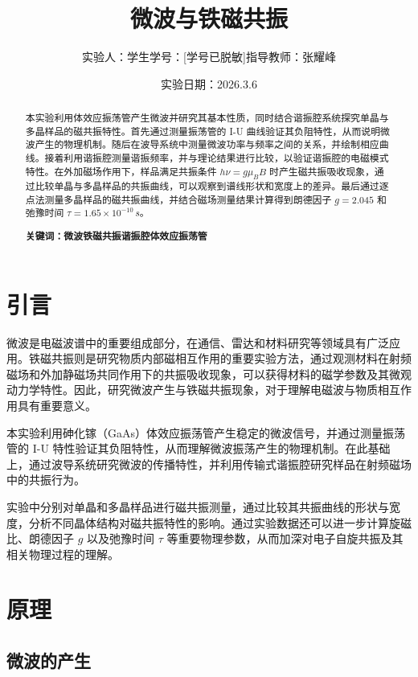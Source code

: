 \documentclass[a4paper, 1.5lines]{ctexart}
\title{微波与铁磁共振}
\author{实验人：学生\qquad 学号：[学号已脱敏]\qquad 指导教师：张耀峰}
\date{实验日期：2026.3.6}
\begin{document}
    
    \maketitle
    
    \begin{abstract}
         
        本实验利用体效应振荡管产生微波并研究其基本性质，同时结合谐振腔系统探究单晶与多晶样品的磁共振特性。首先通过测量振荡管的 I-U 曲线验证其负阻特性，从而说明微波产生的物理机制。随后在波导系统中测量微波功率与频率之间的关系，并绘制相应曲线。接着利用谐振腔测量谐振频率，并与理论结果进行比较，以验证谐振腔的电磁模式特性。在外加磁场作用下，样品满足共振条件 $h\nu = g\mu_B B$ 时产生磁共振吸收现象，通过比较单晶与多晶样品的共振曲线，可以观察到谱线形状和宽度上的差异。最后通过逐点法测量多晶样品的磁共振曲线，并结合磁场测量结果计算得到朗德因子 $g = 2.045$ 和弛豫时间 $\tau = 1.65 \times 10^{-10}\,s$。

        \textbf{\textbf{关键词：微波\quad 铁磁共振\quad 谐振腔\quad 体效应振荡管}}
    \end{abstract}
    
    \section{引言}
        微波是电磁波谱中的重要组成部分，在通信、雷达和材料研究等领域具有广泛应用。铁磁共振则是研究物质内部磁相互作用的重要实验方法，通过观测材料在射频磁场和外加静磁场共同作用下的共振吸收现象，可以获得材料的磁学参数及其微观动力学特性。因此，研究微波产生与铁磁共振现象，对于理解电磁波与物质相互作用具有重要意义。

        本实验利用砷化镓（GaAs）体效应振荡管产生稳定的微波信号，并通过测量振荡管的 I-U 特性验证其负阻特性，从而理解微波振荡产生的物理机制。在此基础上，通过波导系统研究微波的传播特性，并利用传输式谐振腔研究样品在射频磁场中的共振行为。

        实验中分别对单晶和多晶样品进行磁共振测量，通过比较其共振曲线的形状与宽度，分析不同晶体结构对磁共振特性的影响。通过实验数据还可以进一步计算旋磁比、朗德因子 $g$ 以及弛豫时间 $\tau$ 等重要物理参数，从而加深对电子自旋共振及其相关物理过程的理解。
    \section{原理}

    \subsection{微波的产生}
\end{document}
